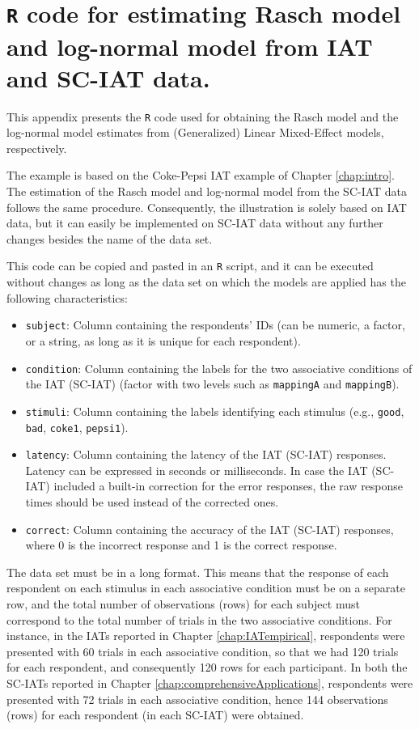 \documentclass[12pt]{book}
\begin{document}
\chapter[Appendix A]{\texttt{R} code for estimating Rasch model and log-normal model from IAT and SC-IAT data.} \label{chap:appendixA}

This appendix presents the \verb*|R| code used for obtaining the Rasch model and the log-normal model estimates from (Generalized) Linear Mixed-Effect models, respectively.

The example is based on the Coke-Pepsi IAT example of Chapter \ref{chap:intro}. 
The estimation of the Rasch model and log-normal model from the SC-IAT data follows the same procedure. 
Consequently, the illustration is solely based on IAT data, but it can easily be implemented on SC-IAT data without any further changes besides the name of the data set.


This code can be copied and pasted in an \texttt{R} script, and it can be executed without changes as long as the data set on which the models are applied has the following characteristics: 

\begin{itemize}
	\item \texttt{subject}: Column containing the respondents' IDs (can be numeric, a factor, or a string, as long as it is unique for each respondent).
	\item\texttt{condition}: Column containing the labels for the two associative conditions of the IAT (SC-IAT) (factor with two levels such as \texttt{mappingA} and \texttt{mappingB}).
	\item \texttt{stimuli}: Column containing the labels identifying each stimulus (e.g., \texttt{good}, \texttt{bad}, \texttt{coke1}, \texttt{pepsi1}).
	\item \texttt{latency}: Column containing the latency of the IAT (SC-IAT) responses. Latency can be expressed in seconds or milliseconds. In case the IAT (SC-IAT) included a built-in correction for the error responses, the raw response times should be used instead of the corrected ones.
	\item \texttt{correct}: Column containing the accuracy of the IAT (SC-IAT) responses, where 0 is the incorrect response and 1 is the correct response.
\end{itemize}

The data set must be in a long format. This means that the response of each respondent on each stimulus in each associative condition must be on a separate row, and the total number of observations (rows) for each subject must correspond to the total number of trials in the two associative conditions. 
For instance, in the IATs reported in Chapter \ref{chap:IATempirical}, respondents were presented with 60 trials in each associative condition, so that we had 120 trials for each respondent, and consequently 120 rows for each participant. 
In both the SC-IATs reported in Chapter \ref{chap:comprehensiveApplications}, respondents were presented with 72 trials in each associative condition, hence 144 observations (rows) for each respondent (in each SC-IAT) were obtained.
\end{document}
